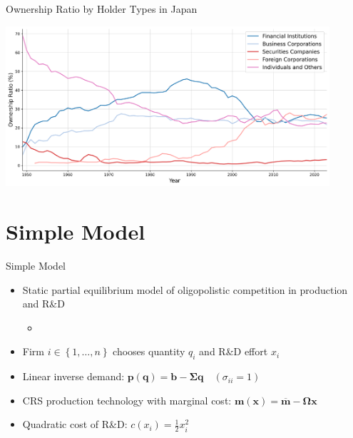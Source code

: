 \documentclass[
  10pt,               %
  aspectratio=169,    %
  handout             %
]{beamer}
\theoremstyle{plain}
\begin{document}
\begin{frame}{Ownership Ratio by Holder Types in Japan}
  \label{ownership_japan} %
  \begin{center}
    \includegraphics[width=12cm]{figures/ownership_ratio_plot.png}
  \end{center}
\end{frame}

\section{Simple Model}

\begin{frame}{Simple Model}
  \begin{itemize}
    \item Static partial equilibrium model of oligopolistic competition in production and R\&D \\
    \begin{itemize}
      \item {\footnotesize \citet{d-Aspremont1988-je,Kamien1992-la,Leahy1997-xr,Lopez2019-sl,Anton2024-pw}} %
    \end{itemize}
          \medskip{}
    \item Firm $i\in \left\{1,\ldots, n\right\}$ chooses quantity $q_i$ and R\&D effort $x_i$
          \medskip{}
    \item Linear inverse demand: $\bm{p}(\bm{q}) = \bm{b} - \bm{\Sigma} \bm{q} \quad (\sigma_{ii} = 1)$
          \medskip{}
    \item CRS production technology with marginal cost: $\bm{m}(\bm{x}) = \overline{\bm{m}} - \bm{\Omega} \bm{x}$\medskip{}
    \item Quadratic cost of R\&D: $c(x_i) = \frac{1}{2}x_i^2$
  \end{itemize}
\end{frame}
\end{document}
